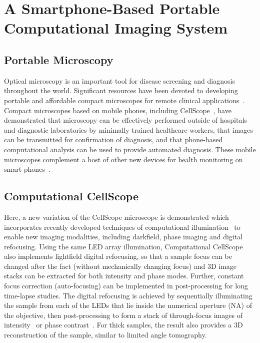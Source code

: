 \chapter{A Smartphone-Based Portable Computational Imaging System}
\section{Portable Microscopy}
Optical microscopy is an important tool for disease screening and diagnosis throughout the world. Significant resources have been devoted to developing portable and affordable compact microscopes for remote clinical applications~\cite{Zhu2011, switz2014low, smith2011cell, maamari2013mobile,C4LC00010B,Vashist2014,steenblik2005lenses,10.1371/journal.pone.0098781,boppart2014point,Greenbaum17122014,mudanyali2010compact,tseng2010lensfree}. Compact microscopes based on mobile phones, including CellScope~\cite{10.1371/journal.pone.0006320,10.1371/journal.pone.0096906}, have demonstrated that microscopy can be effectively performed outside of hospitals and diagnostic laboratories by minimally trained healthcare workers, that images can be transmitted for confirmation of diagnosis, and that phone-based computational analysis can be used to provide automated diagnosis. These mobile microscopes complement a host of other new devices for health monitoring on smart phones~\cite{oncescu2014cholesterol, pamplona2010netra, eyeexaminer, peekvision}. 

\section{Computational CellScope}
Here, a new variation of the CellScope microscope is demonstrated which incorporates recently developed techniques of computational illumination~\cite{Zheng2011, Tian14, zijiMulti} to enable new imaging modalities, including darkfield, phase imaging and digital refocusing. Using the same LED array illumination, Computational CellScope also implements lightfield digital refocusing, so that a sample focus can be changed after the fact (without mechanically changing focus) and 3D image stacks can be extracted for both intensity and phase modes. Further, constant focus correction (auto-focusing) can be implemented in post-processing for long time-lapse studies. The digital refocusing is achieved by sequentially illuminating the sample from each of the LEDs that lie inside the numerical aperture (NA) of the objective, then post-processing to form a stack of through-focus images of intensity~\cite{Ng2005,Zheng2011} or phase contrast~\cite{Tian14}. For thick samples, the result also provides a 3D reconstruction of the sample, similar to limited angle tomography.

